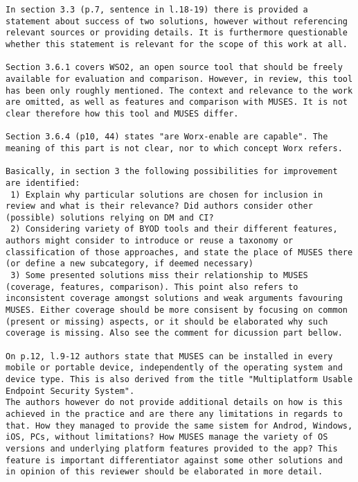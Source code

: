 \documentclass[preprint]{elsarticle}
\begin{document}
\begin{verbatim}
In section 3.3 (p.7, sentence in l.18-19) there is provided a statement about success of two solutions, however without referencing relevant sources or providing details. It is furthermore questionable whether this statement is relevant for the scope of this work at all.

Section 3.6.1 covers WSO2, an open source tool that should be freely available for evaluation and comparison. However, in review, this tool has been only roughly mentioned. The context and relevance to the work are omitted, as well as features and comparison with MUSES. It is not clear therefore how this tool and MUSES differ.

Section 3.6.4 (p10, 44) states "are Worx-enable are capable". The meaning of this part is not clear, nor to which concept Worx refers.

Basically, in section 3 the following possibilities for improvement are identified:
 1) Explain why particular solutions are chosen for inclusion in review and what is their relevance? Did authors consider other (possible) solutions relying on DM and CI?
 2) Considering variety of BYOD tools and their different features, authors might consider to introduce or reuse a taxonomy or classification of those approaches, and state the place of MUSES there (or define a new subcategory, if deemed necessary)
 3) Some presented solutions miss their relationship to MUSES (coverage, features, comparison). This point also refers to inconsistent coverage amongst solutions and weak arguments favouring MUSES. Either coverage should be more consisent by focusing on common (present or missing) aspects, or it should be elaborated why such coverage is missing. Also see the comment for dicussion part bellow.

On p.12, l.9-12 authors state that MUSES can be installed in every mobile or portable device, independently of the operating system and device type. This is also derived from the title "Multiplatform Usable Endpoint Security System".
The authors however do not provide additional details on how is this achieved in the practice and are there any limitations in regards to that. How they managed to provide the same sistem for Androd, Windows, iOS, PCs, without limitations? How MUSES manage the variety of OS versions and underlying platform features provided to the app? This feature is important differentiator against some other solutions and in opinion of this reviewer should be elaborated in more detail.


\end{verbatim}
\end{document}
